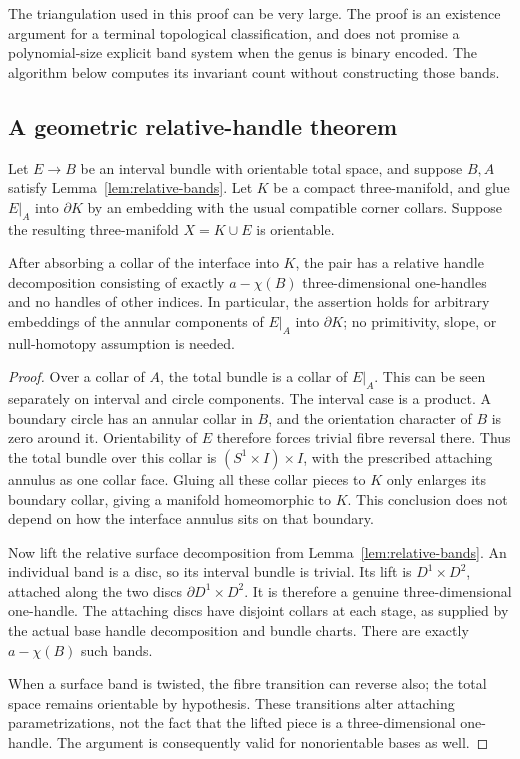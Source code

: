 The triangulation used in this proof can be very large.  The proof is an
existence argument for a terminal topological classification, and does
not promise a polynomial-size explicit band system when the genus is
binary encoded.  The algorithm below computes its invariant count
without constructing those bands.

\subsection{A geometric relative-handle theorem}

\begin{theorem}\label{thm:proper-bundle}
Let $E\to B$ be an interval bundle with orientable total space, and suppose
$B,A$ satisfy Lemma~\ref{lem:relative-bands}.  Let $K$ be a compact
three-manifold, and glue $E|_A$ into $\partial K$ by an embedding with the
usual compatible corner collars.  Suppose the resulting three-manifold
$X=K\cup E$ is orientable.

After absorbing a collar of the interface into $K$, the pair has a relative
handle decomposition consisting of exactly $a-\chi(B)$ three-dimensional
one-handles and no handles of other indices.  In particular, the assertion
holds for arbitrary embeddings of the annular components of $E|_A$ into
$\partial K$; no primitivity, slope, or null-homotopy assumption is needed.
\end{theorem}

\begin{proof}
Over a collar of $A$, the total bundle is a collar of $E|_A$.  This can be
seen separately on interval and circle components.  The interval case is
a product.  A boundary circle has an annular collar in $B$, and the
orientation character of $B$ is zero around it.  Orientability of $E$
therefore forces trivial fibre reversal there.  Thus the total bundle
over this collar is $(S^1\times I)\times I$, with the prescribed attaching
annulus as one collar face.  Gluing all these collar pieces to $K$
only enlarges its boundary collar, giving a manifold homeomorphic to $K$.
This conclusion does not depend on how the interface annulus sits on that
boundary.

Now lift the relative surface decomposition from
Lemma~\ref{lem:relative-bands}.  An individual band is a disc, so its
interval bundle is trivial.  Its lift is $D^1\times D^2$, attached along
the two discs $\partial D^1\times D^2$.  It is therefore a genuine
three-dimensional one-handle.  The attaching discs have disjoint collars
at each stage, as supplied by the actual base handle decomposition and
bundle charts.  There are exactly $a-\chi(B)$ such bands.

When a surface band is twisted, the fibre transition can reverse also;
the total space remains orientable by hypothesis.  These transitions
alter attaching parametrizations, not the fact that the lifted piece is
a three-dimensional one-handle.  The argument is consequently valid for
nonorientable bases as well.
\end{proof}

